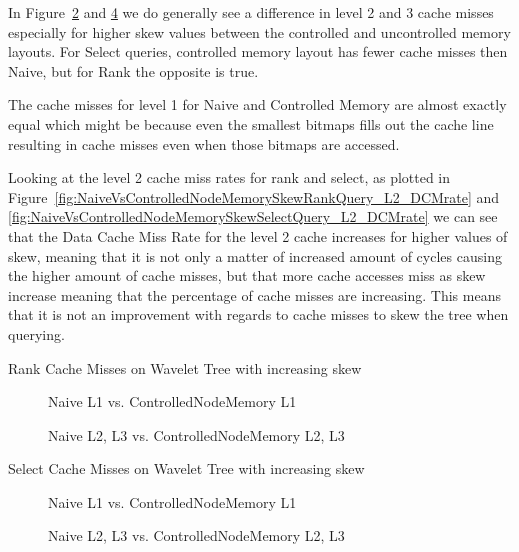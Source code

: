 In Figure~\ref{fig:L2L3NaiveControlledNodeMemoryRankSkewCacheMisses} and \ref{fig:L2L3NaiveControlledNodeMemorySelectSkewCacheMisses} we do generally see a difference in level 2 and 3 cache misses especially for higher skew values between the controlled and uncontrolled memory layouts. For Select queries, controlled memory layout has fewer cache misses then Naive, but for Rank the opposite is true.

The cache misses for level 1 for Naive and Controlled Memory are almost exactly equal which might be because even the smallest bitmaps fills out the cache line resulting in cache misses even when those bitmaps are accessed.

Looking at the level 2 cache miss rates for rank and select, as plotted in Figure~\ref{fig:NaiveVsControlledNodeMemorySkewRankQuery_L2_DCMrate} and \ref{fig:NaiveVsControlledNodeMemorySkewSelectQuery_L2_DCMrate} we can see that the Data Cache Miss Rate for the level 2 cache increases for higher values of skew, meaning that it is not only a matter of increased amount of cycles causing the higher amount of cache misses, but that more cache accesses miss as skew increase meaning that the percentage of cache misses are increasing.
This means that it is not an improvement with regards to cache misses to skew the tree when querying.

\figureBegin
\caption{Rank Cache Misses on Wavelet Tree with increasing skew}
\label{fig:NaiveControlledNodeMemoryRankSkewCacheMisses}
\centering
\begin{subfigure}{\textwidth}
	\caption{Naive L1 vs. ControlledNodeMemory L1}
	\label{fig:L1NaiveControlledNodeMemoryRankSkewCacheMisses}
	
	\vspace*{5 mm}
\end{subfigure}
\begin{subfigure}{\textwidth}
	\caption{Naive L2, L3 vs. ControlledNodeMemory L2, L3}
	\label{fig:L2L3NaiveControlledNodeMemoryRankSkewCacheMisses}
 	
\end{subfigure}
\figureEnd

\figureBegin
\caption{Select Cache Misses on Wavelet Tree with increasing skew}
\label{fig:NaiveControlledNodeMemorySelectSkewCacheMisses}
\centering
\begin{subfigure}{\textwidth}
	\caption{Naive L1 vs. ControlledNodeMemory L1}
	\label{fig:L1NaiveControlledNodeMemorySelectSkewCacheMisses}
	
	\vspace*{5 mm}
\end{subfigure}
\begin{subfigure}{\textwidth}
	\caption{Naive L2, L3 vs. ControlledNodeMemory L2, L3}
	\label{fig:L2L3NaiveControlledNodeMemorySelectSkewCacheMisses}
 	
\end{subfigure}
\figureEnd


